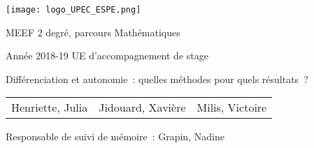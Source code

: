 \begin{titlepage}
    \begin{center}
        \texttt{[image: logo\_UPEC\_ESPE.png]}

        MEEF 2 degré, parcours Mathématiques

        Année 2018-19 UE d'accompagnement de stage

        \vspace*{\fill}

        \Huge{Différenciation et autonomie : quelles méthodes pour quels résultats ?}

        \vspace*{\fill}

        \begin{tabular}{ccc}
            \Large{Henriette, Julia}&\Large{Jidouard, Xavière}&\Large{Milis, Victoire}
        \end{tabular}

        \vspace*{\fill}

        \Large{Responsable de suivi de mémoire : Grapin, Nadine}

        \vspace*{\fill}
    \end{center}
\end{titlepage}
